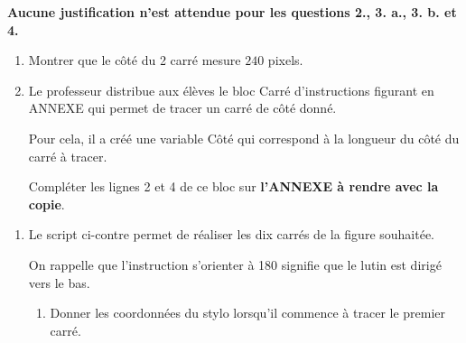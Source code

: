 \documentclass[11pt]{article}
\begin{document}
\textbf{Aucune justification n'est attendue pour les questions 2., 3. a., 3. b. et 4.}

\medskip

\begin{enumerate}
\item Montrer que le côté du 2 carré mesure $240$ pixels.
\item Le professeur distribue aux élèves le bloc \og Carré \fg{} d'instructions figurant en ANNEXE qui permet de tracer un carré de côté donné.

Pour cela, il a créé une variable \og Côté \fg{} qui correspond à la longueur du côté du carré à tracer.

Compléter les lignes 2 et 4 de ce bloc sur \textbf{l'ANNEXE à rendre avec la copie}.
\end{enumerate}

\begin{minipage}[t]{9.5cm}
\begin{enumerate}[resume]
\item Le script ci-contre permet de réaliser les dix carrés de la figure souhaitée.

On rappelle que l'instruction \og s'orienter à 180 \fg{} signifie que le lutin est dirigé vers le bas.
	\begin{enumerate}
		\item Donner les coordonnées du stylo lorsqu'il commence à tracer le premier carré.
	\end{enumerate}
\end{enumerate}
\end{minipage}
\hfill
\begin{minipage}[t]{5.5cm}
\begin{scratch}[num blocks, scale=0.8]
{
}

\end{scratch}
\end{minipage}
\end{document}
